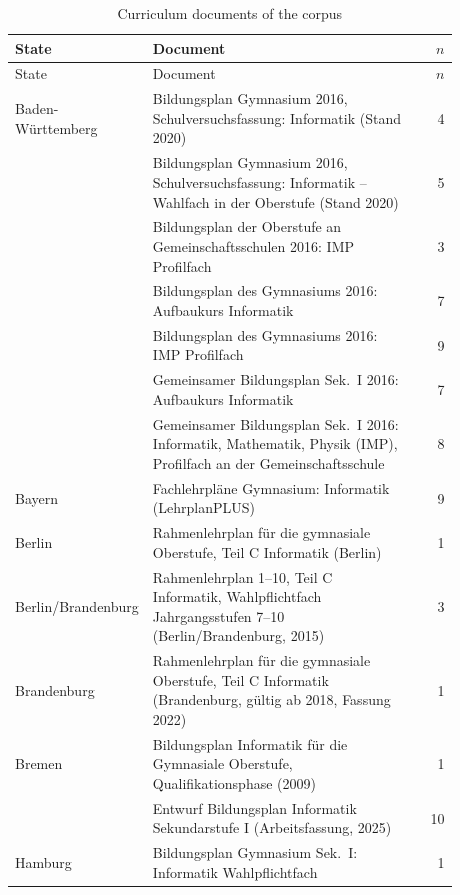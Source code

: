 \begin{longtable}{@{}p{0.28\linewidth}p{0.6\linewidth}r@{}}
\caption{Curriculum documents of the corpus}\label{tab:curricula-documents}\\
\toprule
State & Document & $n$ \\
\midrule
\endfirsthead
\toprule
State & Document & $n$ \\
\midrule
\endhead
\bottomrule
\endlastfoot
Baden-Württemberg & Bildungsplan Gymnasium 2016, Schulversuchsfassung: Informatik (Stand 2020) \parencite{MinisteriumKultus2020} & 4 \\
 & Bildungsplan Gymnasium 2016, Schulversuchsfassung: Informatik -- Wahlfach in der Oberstufe (Stand 2020) \parencite{MinisteriumKultus2020a} & 5 \\
 & Bildungsplan der Oberstufe an Gemeinschaftsschulen 2016: IMP Profilfach \parencite{MinisteriumKultus2018c} & 3 \\
 & Bildungsplan des Gymnasiums 2016: Aufbaukurs Informatik \parencite{MinisteriumKultus2017} & 7 \\
 & Bildungsplan des Gymnasiums 2016: IMP Profilfach \parencite{MinisteriumKultus2018d} & 9 \\
 & Gemeinsamer Bildungsplan Sek.\ I 2016: Aufbaukurs Informatik \parencite{MinisteriumKultus2018b} & 7 \\
 & Gemeinsamer Bildungsplan Sek.\ I 2016: Informatik, Mathematik, Physik (IMP), Profilfach an der Gemeinschaftsschule \parencite{MinisteriumKultus2018a} & 8 \\
Bayern & Fachlehrpläne Gymnasium: Informatik (LehrplanPLUS) \parencite{ISB2024} & 9 \\
Berlin & Rahmenlehrplan für die gymnasiale Oberstufe, Teil C Informatik (Berlin) \parencite{SenatsverwaltungBildung2022} & 1 \\
Berlin/Brandenburg & Rahmenlehrplan 1--10, Teil C Informatik, Wahlpflichtfach Jahrgangsstufen 7--10 (Berlin/Brandenburg, 2015) \parencite{SenatsverwaltungBildung2015} & 3 \\
Brandenburg & Rahmenlehrplan für die gymnasiale Oberstufe, Teil C Informatik (Brandenburg, gültig ab 2018, Fassung 2022) \parencite{MinisteriumBildung2022} & 1 \\
Bremen & Bildungsplan Informatik für die Gymnasiale Oberstufe, Qualifikationsphase (2009) \parencite{DSBW2009} & 1 \\
 & Entwurf Bildungsplan Informatik Sekundarstufe I (Arbeitsfassung, 2025) \parencite{Schule2025} & 10 \\
Hamburg & Bildungsplan Gymnasium Sek.\ I: Informatik Wahlpflichtfach \parencite{FHH2011} & 1 \\

\end{longtable}
